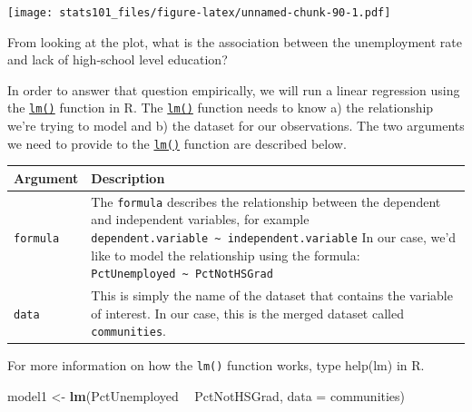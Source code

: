 \documentclass[]{article}
\newenvironment{Shaded}{\begin{snugshade}}{\end{snugshade}}
\newcommand{\DataTypeTok}[1]{\textcolor[rgb]{0.13,0.29,0.53}{#1}}
\newcommand{\KeywordTok}[1]{\textcolor[rgb]{0.13,0.29,0.53}{\textbf{#1}}}
\newcommand{\NormalTok}[1]{#1}
\newcommand{\OperatorTok}[1]{\textcolor[rgb]{0.81,0.36,0.00}{\textbf{#1}}}
\newcommand{\StringTok}[1]{\textcolor[rgb]{0.31,0.60,0.02}{#1}}
\begin{document}
\texttt{[image: stats101\_files/figure-latex/unnamed-chunk-90-1.pdf]}

From looking at the plot, what is the association between the unemployment rate and lack of high-school level education?

In order to answer that question empirically, we will run a linear regression using the \href{http://bit.ly/R_lm}{\texttt{lm()}} function in R. The \href{http://bit.ly/R_lm}{\texttt{lm()}} function needs to know a) the relationship we're trying to model and b) the dataset for our observations. The two arguments we need to provide to the \href{http://bit.ly/R_lm}{\texttt{lm()}} function are described below.

\begin{longtable}[]{@{}ll@{}}
\toprule
\begin{minipage}[b]{0.11\columnwidth}\raggedright
Argument\strut
\end{minipage} & \begin{minipage}[b]{0.83\columnwidth}\raggedright
Description\strut
\end{minipage}\tabularnewline
\midrule
\endhead
\begin{minipage}[t]{0.11\columnwidth}\raggedright
\texttt{formula}\strut
\end{minipage} & \begin{minipage}[t]{0.83\columnwidth}\raggedright
The \texttt{formula} describes the relationship between the dependent and independent variables, for example \texttt{dependent.variable\ \textasciitilde{}\ independent.variable} In our case, we'd like to model the relationship using the formula: \texttt{PctUnemployed\ \textasciitilde{}\ PctNotHSGrad}\strut
\end{minipage}\tabularnewline
\begin{minipage}[t]{0.11\columnwidth}\raggedright
\texttt{data}\strut
\end{minipage} & \begin{minipage}[t]{0.83\columnwidth}\raggedright
This is simply the name of the dataset that contains the variable of interest. In our case, this is the merged dataset called \texttt{communities}.\strut
\end{minipage}\tabularnewline
\bottomrule
\end{longtable}

For more information on how the \texttt{lm()} function works, type help(lm) in R.

\begin{Shaded}
\begin{Highlighting}[]
\NormalTok{model1 <-}\StringTok{ }\KeywordTok{lm}\NormalTok{(PctUnemployed }\OperatorTok{~}\StringTok{ }\NormalTok{PctNotHSGrad, }\DataTypeTok{data =}\NormalTok{ communities)}
\end{Highlighting}
\end{Shaded}
\end{document}
